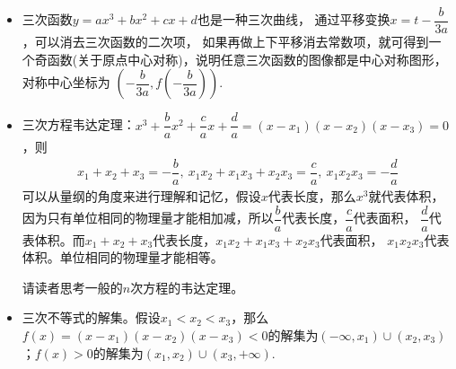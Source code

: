 \begin{itemize}[leftmargin=\inteval{\myitemleftmargin}pt,itemsep=
   \inteval{\myitemitempsep}pt,topsep=\inteval{\myitemtopsep}pt]
\item 三次函数$ y=ax^3+bx^2+cx+d $也是一种三次曲线，
通过平移变换$ x=t-\dfrac{b}{3a} $，可以消去三次函数的二次项，
如果再做上下平移消去常数项，就可得到一个奇函数(关于原点中心对称)，说明任意三次函数的图像都是中心对称图形，对称中心坐标为 $ (-\dfrac{b}{3a},f(-\dfrac{b}{3a})) $. 

\item 三次方程韦达定理：$ x^3+\dfrac{b}{a}x^2+\dfrac{c}{a}x+
\dfrac{d}{a}=(x-x_1)(x-x_2)(x-x_3)=0$，则
\begin{align}\label{三次方程韦达定理}
    x_1+x_2+x_3=-\dfrac{b}{a},\ x_1x_2+x_1x_3+x_2x_3=\dfrac{c}{a},\ x_1x_2x_3=-\dfrac{d}{a}
\end{align}
可以从量纲的角度来进行理解和记忆，假设$ x $代表长度，那么$ x^3 $就代表体积，
因为只有单位相同的物理量才能相加减，所以$ \dfrac{b}{a} $代表长度，$ \dfrac{c}{a} $代表面积，
$ \dfrac{d}{a} $代表体积。而$ x_1+x_2+x_3 $代表长度，$ x_1x_2+x_1x_3+x_2x_3 $代表面积，
$ x_1x_2x_3 $代表体积。单位相同的物理量才能相等。

请读者思考一般的$ n $次方程的韦达定理。

\item 三次不等式的解集。假设$ x_1<x_2<x_3 $，那么$ f(x)=(x-x_1)(x-x_2)(x-x_3)
<0 $的解集为$ (-\infty,x_1)\cup (x_2,x_3) $；$ f(x)>0 $的解集为$ (x_1,x_2)\cup
(x_3,+\infty) $. 


\end{itemize}
